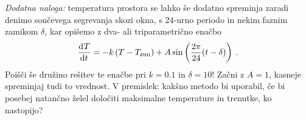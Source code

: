 \documentclass[slovene,11pt,a4paper]{article}
\newcommand{\ddd}{\mathrm{d}}
\newcommand{\Dd}[3][{}]{\frac{\ddd^{#1} #2}{\ddd #3^{#1}}}
\begin{document}
\bigskip

{\it Dodatna naloga\/:} temperatura prostora se lahko še
dodatno spreminja zaradi denimo sončevega segrevanja
skozi okna, s $24$-urno periodo in nekim faznim zamikom $\delta$,
kar opišemo z dva- ali triparametrično enačbo
\begin{equation}
\Dd{T}{t} = - k \left( T-T_\mathrm{zun} \right)
+ A\sin\left( {2\pi\over 24}(t-\delta) \right) \>.
\label{cooling2}
\end{equation}
Poišči še družino rešitev te enačbe pri
$k=0.1$ in $\delta=10$!  Začni z $A=1$, kasneje spreminjaj tudi
to vrednost.  V premislek: kakšno metodo bi uporabil, če bi posebej
natančno želel določiti maksimalne temperature in trenutke,
ko nastopijo?


\end{document}
